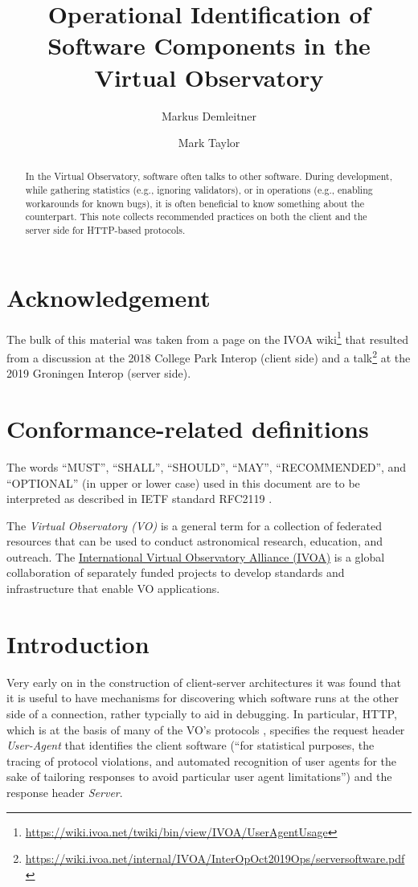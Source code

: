 \documentclass[11pt,a4paper]{ivoa}
\title{Operational Identification of Software Components in the Virtual
Observatory}
\author[https://wiki.ivoa.net/twiki/bin/view/IVOA/WebHome?topic=MarkusDemleitner]{Markus
Demleitner}
\author[https://wiki.ivoa.net/twiki/bin/view/IVOA/MarkusDemleitner?topic=MarkTaylor]{Mark
Taylor}
\begin{document}
\begin{abstract}
In the Virtual Observatory, software often talks to other software.
During development, while gathering statistics (e.g., ignoring
validators), or in operations (e.g., enabling workarounds for known
bugs), it is often beneficial to know something about the
counterpart.  This note collects recommended practices on both the
client and the server side for HTTP-based protocols.
\end{abstract}

\section*{Acknowledgement}

The bulk of this material was taken from a page on the IVOA
wiki\footnote{\url{https://wiki.ivoa.net/twiki/bin/view/IVOA/UserAgentUsage}}
that resulted from a discussion at the 2018 College Park Interop (client
side) and a
talk\footnote{\url{https://wiki.ivoa.net/internal/IVOA/InterOpOct2019Ops/serversoftware.pdf}}
at the 2019 Groningen Interop (server side).


\section*{Conformance-related definitions}

The words ``MUST'', ``SHALL'', ``SHOULD'', ``MAY'', ``RECOMMENDED'', and
``OPTIONAL'' (in upper or lower case) used in this document are to be
interpreted as described in IETF standard RFC2119 \citep{std:RFC2119}.

The \emph{Virtual Observatory (VO)} is a
general term for a collection of federated resources that can be used
to conduct astronomical research, education, and outreach.
The \href{http://www.ivoa.net}{International
Virtual Observatory Alliance (IVOA)} is a global
collaboration of separately funded projects to develop standards and
infrastructure that enable VO applications.


\section{Introduction}

Very early on in the construction of client-server architectures it was
found that it is useful to have mechanisms for 
discovering which software runs
at the other side of a connection, rather typcially to aid in debugging.
In particular, HTTP, which is at the basis of many of the VO's protocols
\citep{std:HTTP}, specifies the request header \emph{User-Agent} that
identifies the client software (``for statistical purposes, the tracing
of protocol violations, and automated recognition of user agents for the
sake of tailoring responses to avoid particular user agent
limitations'') and the response header \emph{Server}.
\end{document}
